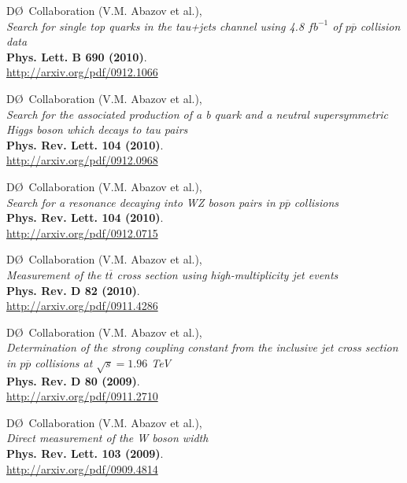 \documentclass[12pt]{article}
\begin{document}
%
D\O~Collaboration (V.M. Abazov et al.), \\
\textsl{Search for single top quarks in the tau+jets channel using 4.8 $fb^{-1}$ of $p\overline{p}$ collision data}\\
\textbf{Phys. Lett. B 690 (2010)}.\\
{\small{\url{http://arxiv.org/pdf/0912.1066}}}\vspace{4mm}

%
D\O~Collaboration (V.M. Abazov et al.), \\
\textsl{Search for the associated production of a b quark and a neutral supersymmetric Higgs boson which decays to tau pairs}\\
\textbf{Phys. Rev. Lett. 104 (2010)}.\\
{\small{\url{http://arxiv.org/pdf/0912.0968}}}\vspace{4mm}

%
D\O~Collaboration (V.M. Abazov et al.), \\
\textsl{Search for a resonance decaying into WZ boson pairs in $p\overline{p}$ collisions}\\
\textbf{Phys. Rev. Lett. 104 (2010)}.\\
{\small{\url{http://arxiv.org/pdf/0912.0715}}}\vspace{4mm}

%
D\O~Collaboration (V.M. Abazov et al.), \\
\textsl{Measurement of the $t\overline{t}$ cross section using high-multiplicity jet events}\\
\textbf{Phys. Rev. D 82 (2010)}.\\
{\small{\url{http://arxiv.org/pdf/0911.4286}}}\vspace{4mm}

%
D\O~Collaboration (V.M. Abazov et al.), \\
\textsl{Determination of the strong coupling constant from the inclusive jet cross section in $p\overline{p}$ collisions at $\sqrt{s}=1.96$ TeV}\\
\textbf{Phys. Rev. D 80 (2009)}.\\
{\small{\url{http://arxiv.org/pdf/0911.2710}}}\vspace{4mm}

%
D\O~Collaboration (V.M. Abazov et al.), \\
\textsl{Direct measurement of the W boson width}\\
\textbf{Phys. Rev. Lett. 103 (2009)}.\\
{\small{\url{http://arxiv.org/pdf/0909.4814}}}\vspace{4mm}
\end{document}
